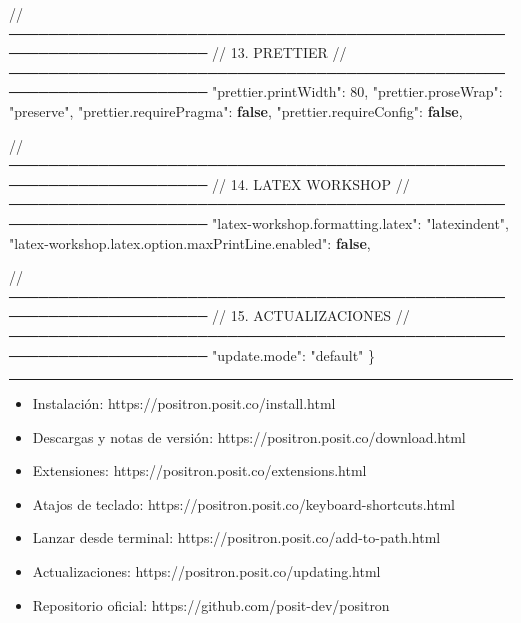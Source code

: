 \documentclass[
  doc,
  floatsintext,
  longtable,
  a4paper,
  nolmodern,
  notxfonts,
  notimes,
  12pt,
  colorlinks=true,linkcolor=blue,citecolor=blue,urlcolor=blue]{apa7}
\newenvironment{Shaded}{\begin{snugshade}}{\end{snugshade}}
\newcommand{\DataTypeTok}[1]{\textcolor[rgb]{0.68,0.00,0.00}{#1}}
\newcommand{\DecValTok}[1]{\textcolor[rgb]{0.68,0.00,0.00}{#1}}
\newcommand{\ErrorTok}[1]{\textcolor[rgb]{0.68,0.00,0.00}{#1}}
\newcommand{\FunctionTok}[1]{\textcolor[rgb]{0.28,0.35,0.67}{#1}}
\newcommand{\KeywordTok}[1]{\textcolor[rgb]{0.00,0.23,0.31}{\textbf{#1}}}
\newcommand{\StringTok}[1]{\textcolor[rgb]{0.13,0.47,0.30}{#1}}
\providecommand{\tightlist}{%
  \setlength{\itemsep}{0pt}\setlength{\parskip}{0pt}}
\begin{document}
\begin{Shaded}
\begin{Highlighting}[]
  \ErrorTok{//} \ErrorTok{──────────────────────────────────────────────────────────────────────}
  \ErrorTok{//} \ErrorTok{13.} \ErrorTok{PRETTIER}
  \ErrorTok{//} \ErrorTok{──────────────────────────────────────────────────────────────────────}
  \DataTypeTok{"prettier.printWidth"}\FunctionTok{:} \DecValTok{80}\FunctionTok{,}
  \DataTypeTok{"prettier.proseWrap"}\FunctionTok{:} \StringTok{"preserve"}\FunctionTok{,}
  \DataTypeTok{"prettier.requirePragma"}\FunctionTok{:} \KeywordTok{false}\FunctionTok{,}
  \DataTypeTok{"prettier.requireConfig"}\FunctionTok{:} \KeywordTok{false}\FunctionTok{,}

  \ErrorTok{//} \ErrorTok{──────────────────────────────────────────────────────────────────────}
  \ErrorTok{//} \ErrorTok{14.} \ErrorTok{LATEX} \ErrorTok{WORKSHOP}
  \ErrorTok{//} \ErrorTok{──────────────────────────────────────────────────────────────────────}
  \DataTypeTok{"latex{-}workshop.formatting.latex"}\FunctionTok{:} \StringTok{"latexindent"}\FunctionTok{,}
  \DataTypeTok{"latex{-}workshop.latex.option.maxPrintLine.enabled"}\FunctionTok{:} \KeywordTok{false}\FunctionTok{,}

  \ErrorTok{//} \ErrorTok{──────────────────────────────────────────────────────────────────────}
  \ErrorTok{//} \ErrorTok{15.} \ErrorTok{ACTUALIZACIONES}
  \ErrorTok{//} \ErrorTok{──────────────────────────────────────────────────────────────────────}
  \DataTypeTok{"update.mode"}\FunctionTok{:} \StringTok{"default"}
\FunctionTok{\}}
\end{Highlighting}
\end{Shaded}

\begin{center}\rule{0.5\linewidth}{0.5pt}\end{center}

\begin{itemize}
\tightlist
\item
  Instalación: https://positron.posit.co/install.html
\item
  Descargas y notas de versión: https://positron.posit.co/download.html
\item
  Extensiones: https://positron.posit.co/extensions.html
\item
  Atajos de teclado: https://positron.posit.co/keyboard-shortcuts.html
\item
  Lanzar desde terminal: https://positron.posit.co/add-to-path.html
\item
  Actualizaciones: https://positron.posit.co/updating.html
\item
  Repositorio oficial: https://github.com/posit-dev/positron
\end{itemize}
\end{document}
